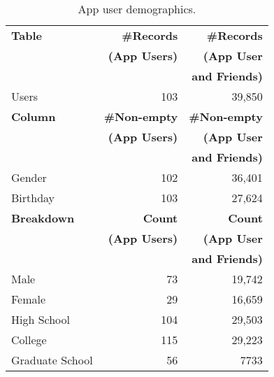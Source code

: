 \begin{table}
\centering
\begin{tabular}{|>{\small}l|>{\small}r|>{\small}r|}
\hline
\textbf{Table} & \textbf{\#Records} & \textbf{\#Records} \\
& \textbf{(App Users)} & \textbf{(App User} \\
& & \textbf{and Friends)} \\
\hline
Users & 103 & 39,850 \\
\hline
\hline
\textbf{Column} & \textbf{\#Non-empty} & \textbf{\#Non-empty} \\
& \textbf{(App Users)} & \textbf{(App User} \\
& & \textbf{and Friends)} \\
\hline
Gender & 102 & 36,401 \\
\hline
Birthday & 103 & 27,624 \\
\hline
\hline
\textbf{Breakdown} & \textbf{Count} & \textbf{Count} \\
& \textbf{(App Users)} & \textbf{(App User} \\
& & \textbf{and Friends)} \\
\hline
Male & 73 & 19,742 \\
\hline
Female & 29 & 16,659 \\
\hline
High School & 104 & 29,503 \\
\hline
College & 115 & 29,223 \\
\hline
Graduate School & 56 & 7733 \\
\hline
\end{tabular}
\caption{App user demographics.}
\label{tab:demographics}
\end{table}

